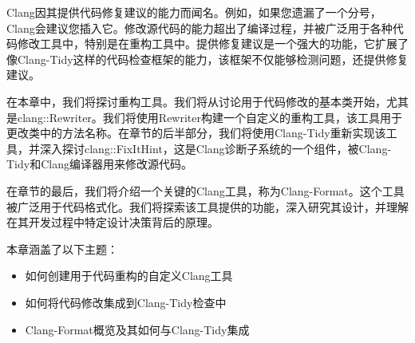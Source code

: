 
Clang因其提供代码修复建议的能力而闻名。例如，如果您遗漏了一个分号，Clang会建议您插入它。修改源代码的能力超出了编译过程，并被广泛用于各种代码修改工具中，特别是在重构工具中。提供修复建议是一个强大的功能，它扩展了像Clang-Tidy这样的代码检查框架的能力，该框架不仅能够检测问题，还提供修复建议。

在本章中，我们将探讨重构工具。我们将从讨论用于代码修改的基本类开始，尤其是clang::Rewriter。我们将使用Rewriter构建一个自定义的重构工具，该工具用于更改类中的方法名称。在章节的后半部分，我们将使用Clang-Tidy重新实现该工具，并深入探讨clang::FixItHint，这是Clang诊断子系统的一个组件，被Clang-Tidy和Clang编译器用来修改源代码。

在章节的最后，我们将介绍一个关键的Clang工具，称为Clang-Format。这个工具被广泛用于代码格式化。我们将探索该工具提供的功能，深入研究其设计，并理解在其开发过程中特定设计决策背后的原理。

本章涵盖了以下主题：

\begin{itemize}
\item
如何创建用于代码重构的自定义Clang工具

\item
如何将代码修改集成到Clang-Tidy检查中

\item
Clang-Format概览及其如何与Clang-Tidy集成
\end{itemize}
















